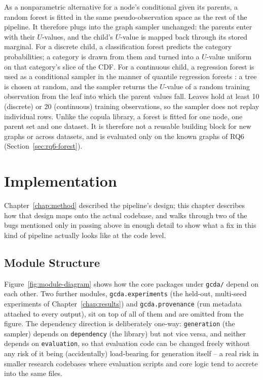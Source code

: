 \documentclass[
  english,
  class=report,
  accentcolor=2c,
  marginpar=false,
  parskip=half-,
  fontsize=11pt,
  ruledheaders=false,
  pdfa=false,
  IMRAD=false,
  thesis={type=master}
]{tudapub}
\begin{document}
As a nonparametric alternative for a node's conditional given its parents,
a random forest \parencite{breiman2001} is fitted in the same
pseudo-observation space as the rest of the pipeline. It therefore plugs
into the graph sampler unchanged: the parents enter with their
$U$-values, and the child's $U$-value is mapped back through its stored
marginal. For a discrete child, a classification forest predicts the
category probabilities; a category is drawn from them and turned into a
$U$-value uniform on that category's slice of the CDF. For a continuous
child, a regression forest is used as a conditional sampler in the manner of
quantile regression forests \parencite{meinshausen2006}: a tree is chosen
at random, and the sampler returns the $U$-value of a random training
observation from the leaf into which the parent values fall. Leaves hold at
least 10 (discrete) or 20 (continuous) training observations, so the
sampler does not replay individual rows. Unlike the copula library, a
forest is fitted for one node, one parent set and one dataset. It is
therefore not a reusable building block for new graphs or across datasets,
and is evaluated only on the known graphs of RQ6
(Section~\ref{sec:rq6-forest}).


\chapter{Implementation}
\label{chap:implementation}

Chapter~\ref{chap:method} described the pipeline's design; this chapter
describes how that design maps onto the actual codebase, and walks through
two of the bugs mentioned only in passing above in enough detail to show
what a fix in this kind of pipeline actually looks like at the code level.

\section{Module Structure}
Figure~\ref{fig:module-diagram} shows how the core packages under
\texttt{gcda/} depend on each other. Two further modules,
\texttt{gcda.experiments} (the
held-out, multi-seed experiments of Chapter~\ref{chap:results}) and
\texttt{gcda.provenance} (run metadata attached to every output), sit on top
of all of them and are omitted from the figure. The dependency direction is
deliberately one-way: \texttt{generation} (the sampler) depends on
\texttt{dependency} (the library) but not vice versa, and neither depends
on \texttt{evaluation}, so that evaluation code can be changed freely
without any risk of it being (accidentally) load-bearing for generation
itself -- a real risk in smaller research codebases where evaluation
scripts and core logic tend to accrete into the same files.
\end{document}
